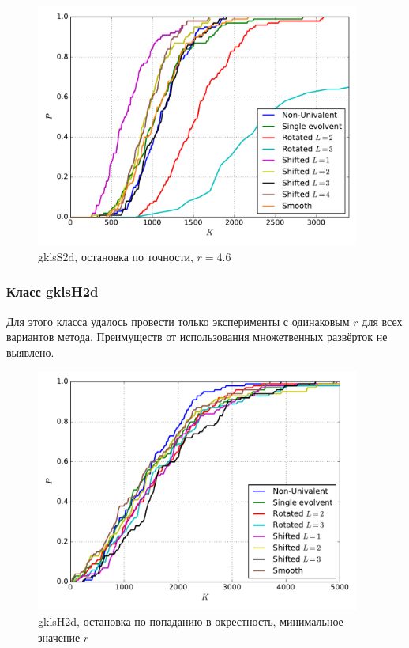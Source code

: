 \documentclass[a4paper]{article}
\begin{document}
\begin{figure}[H]
  \center
  \includegraphics[width=0.95\textwidth]{../gklsS2d/same_r/accuracy/gkls2d_same_r_acc_pt_op.pdf}
  \caption{gklsS2d, остановка по точности, $r=4.6$}
  \label{fig:}
\end{figure}

\subsubsection{Класс gklsH2d}
Для этого класса удалось провести только эксперименты с одинаковым $r$ для всех вариантов метода.
Преимуществ от использования множетвенных развёрток не выявлено.

\begin{figure}
  \center
  \includegraphics[width=0.95\textwidth]{../gklsH2d/opt_point/gklsH2d_opt_pt_op.pdf}
  \caption{gklsH2d, остановка по попаданию в окрестность, минимальное значение $r$}
  \label{fig:}
\end{figure}
\end{document}
